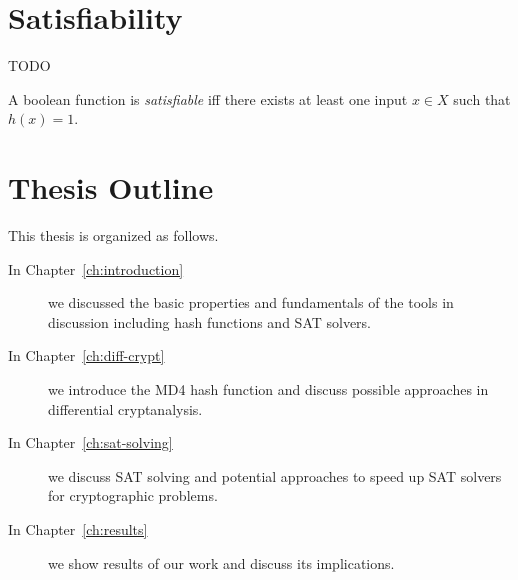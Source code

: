\section{Satisfiability}
\label{ch:sat}
%
TODO

\begin{defi}
  A boolean function is \emph{satisfiable} iff there exists at least one
  input $x \in X$ such that $h(x) = 1$.
\end{defi}



\section{Thesis Outline}
%
This thesis is organized as follows.

\begin{description}
\item[In Chapter~\ref{ch:introduction}] we discussed the basic properties and fundamentals
of the tools in discussion including hash functions and SAT solvers.

\item[In Chapter~\ref{ch:diff-crypt}] we introduce the MD4 hash function and
discuss possible approaches in differential cryptanalysis.

\item[In Chapter~\ref{ch:sat-solving}] we discuss SAT solving and potential
approaches to speed up SAT solvers for cryptographic problems.

\item[In Chapter~\ref{ch:results}] we show results of our work
and discuss its implications.
\end{description}

